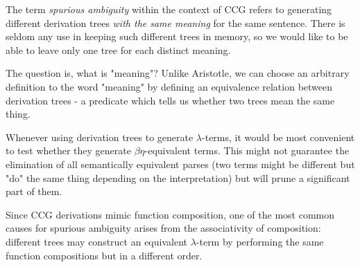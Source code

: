 \documentclass[main.tex]{subfiles}
\begin{document}
The term \emph{spurious ambiguity} within the context of CCG refers to generating
different derivation trees \emph{with the same meaning} for the same sentence. There
is seldom any use in keeping such different trees in memory, so we would like
to be able to leave only one tree for each distinct meaning.

The question is, what is "meaning"? Unlike Aristotle, we can choose an arbitrary
definition to the word "meaning" by defining an equivalence relation between
derivation trees - a predicate which tells us whether two trees mean the same
thing.

Whenever using derivation trees to generate $\lambda$-terms, it would be most
convenient to test whether they generate $\beta\eta$-equivalent terms. This might
not guarantee the elimination of all semantically equivalent parses (two terms
might be different but "do" the same thing depending on the interpretation)
but will prune a significant part of them.

Since CCG derivations mimic function composition, one of the most common causes
for spurious ambiguity arises from the associativity of composition: different
trees may construct an equivalent $\lambda$-term by performing the same function
compositions but in a different order.
\end{document}
